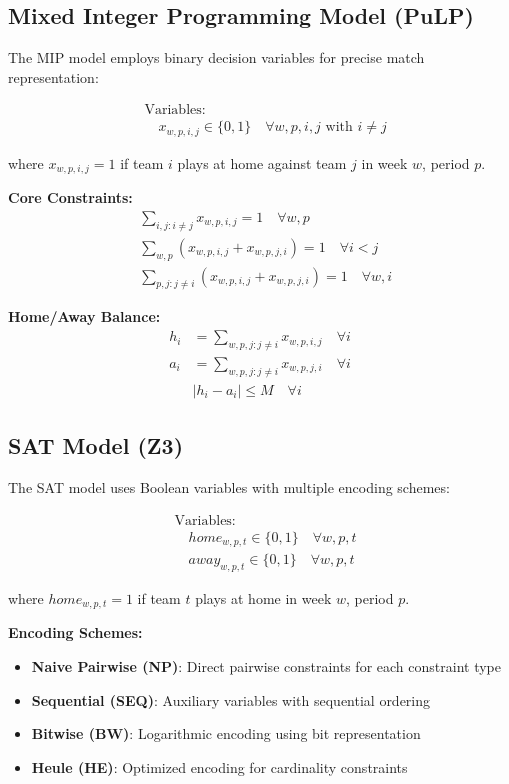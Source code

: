 \documentclass[11pt]{article}
\begin{document}
\begin{itemize}
\subsection{Mixed Integer Programming Model (PuLP)}

The MIP model employs binary decision variables for precise match representation:

\begin{align}
&\text{Variables:} \\
&\quad x_{w,p,i,j} \in \{0,1\} \quad \forall w,p,i,j \text{ with } i \neq j
\end{align}

where $x_{w,p,i,j} = 1$ if team $i$ plays at home against team $j$ in week $w$, period $p$.

\textbf{Core Constraints:}
\begin{align}
&\sum_{i,j: i \neq j} x_{w,p,i,j} = 1 \quad \forall w,p \\
&\sum_{w,p} (x_{w,p,i,j} + x_{w,p,j,i}) = 1 \quad \forall i < j \\
&\sum_{p,j: j \neq i} (x_{w,p,i,j} + x_{w,p,j,i}) = 1 \quad \forall w,i
\end{align}

\textbf{Home/Away Balance:}
\begin{align}
h_i &= \sum_{w,p,j: j \neq i} x_{w,p,i,j} \quad \forall i \\
a_i &= \sum_{w,p,j: j \neq i} x_{w,p,j,i} \quad \forall i \\
&|h_i - a_i| \leq M \quad \forall i
\end{align}

\subsection{SAT Model (Z3)}

The SAT model uses Boolean variables with multiple encoding schemes:

\begin{align}
&\text{Variables:} \\
&\quad home_{w,p,t} \in \{0,1\} \quad \forall w,p,t \\
&\quad away_{w,p,t} \in \{0,1\} \quad \forall w,p,t
\end{align}

where $home_{w,p,t} = 1$ if team $t$ plays at home in week $w$, period $p$.

\textbf{Encoding Schemes:}
\begin{itemize}
    \item \textbf{Naive Pairwise (NP)}: Direct pairwise constraints for each constraint type
    \item \textbf{Sequential (SEQ)}: Auxiliary variables with sequential ordering
    \item \textbf{Bitwise (BW)}: Logarithmic encoding using bit representation
    \item \textbf{Heule (HE)}: Optimized encoding for cardinality constraints
\end{itemize}


\end{itemize}
\end{document}
